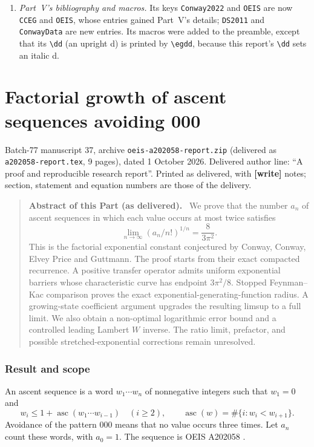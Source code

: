 \documentclass[11pt,letterpaper]{article}
\newcommand{\file}[1]{\nolinkurl{#1}}
\theoremstyle{remark}
\newcommand{\asc}{\operatorname{asc}}
\newenvironment{partabstract}{\begin{quote}\small\noindent\textbf{Abstract of this Part (as delivered).}\ }{\end{quote}}
\newcommand{\partsource}[1]{\par\noindent\begin{minipage}{\textwidth}\small #1\end{minipage}\par\medskip}
\begin{document}
\begin{enumerate}
\item \emph{Part~V's bibliography and macros.} Its keys \texttt{Conway2022} and \texttt{OEIS} are now \texttt{CCEG} and \texttt{OEIS}, whose entries gained Part~V's details; \texttt{DS2011} and \texttt{ConwayData} are new entries. Its macros were added to the preamble, except that its \texttt{\textbackslash dd} (an upright d) is printed by \texttt{\textbackslash egdd}, because this report's \texttt{\textbackslash dd} sets an italic d.
\end{enumerate}

\clearpage
\part{Factorial growth of ascent sequences avoiding 000}\label{a58:part:fd}
\partsource{Batch-77 manuscript 37, archive \file{oeis-a202058-report.zip} (delivered as \file{a202058-report.tex}, 9 pages), dated 1 October 2026. Delivered author line: ``A proof and reproducible research report''. Printed as delivered, with \textbf{[write]} notes; section, statement and equation numbers are those of the delivery.}
\begin{partabstract}
We prove that the number $a_n$ of ascent sequences in which each value occurs at most twice satisfies
\[
 \lim_{n\to\infty}(a_n/n!)^{1/n}=\frac{8}{3\pi^2}.
\]
This is the factorial exponential constant conjectured by Conway, Conway, Elvey Price and Guttmann. The proof starts from their exact compacted recurrence. A positive transfer operator admits uniform exponential barriers whose characteristic curve has endpoint $3\pi^2/8$. Stopped Feynman--Kac comparison proves the exact exponential-generating-function radius. A growing-state coefficient argument upgrades the resulting limsup to a full limit. We also obtain a non-optimal logarithmic error bound and a controlled leading Lambert $W$ inverse. The ratio limit, prefactor, and possible stretched-exponential corrections remain unresolved.
\end{partabstract}

\section{Result and scope}
An ascent sequence is a word $w_1\cdots w_n$ of nonnegative integers such that $w_1=0$ and
\[
 w_i\le1+\asc(w_1\cdots w_{i-1})\quad(i\ge2),\qquad
 \asc(w)=\#\{i:w_i<w_{i+1}\}.
\]
Avoidance of the pattern 000 means that no value occurs three times. Let $a_n$ count these words, with $a_0=1$. The sequence is OEIS A202058 \cite{OEIS}.
\end{document}

